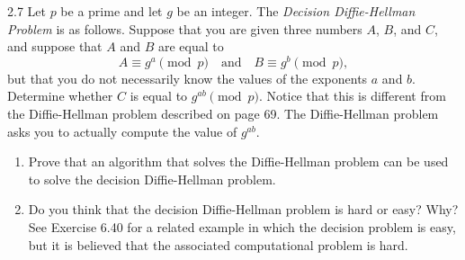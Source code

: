 \begin{exercise}
    {2.7} Let \(p\) be a prime and let \(g\) be an integer. The \textit{Decision Diffie-Hellman Problem} is as follows. Suppose that you are given three numbers \(A\), \(B\), and \(C\), and suppose that \(A\) and \(B\) are equal to
    \[
        A \equiv g^a \pmod{p} \quad \text{and} \quad B \equiv g^b \pmod{p},
    \]
    but that you do not necessarily know the values of the exponents \(a\) and \(b\). Determine whether \(C\) is equal to \(g^{ab} \pmod{p}\). Notice that this is different from the Diffie-Hellman problem described on page 69. The Diffie-Hellman problem asks you to actually compute the value of \(g^{ab}\).
    \begin{enumerate}
        \item Prove that an algorithm that solves the Diffie-Hellman problem can be used to solve the decision Diffie-Hellman problem.
        \item Do you think that the decision Diffie-Hellman problem is hard or easy? Why? See Exercise 6.40 for a related example in which the decision problem is easy, but it is believed that the associated computational problem is hard.
    \end{enumerate}
\end{exercise}


